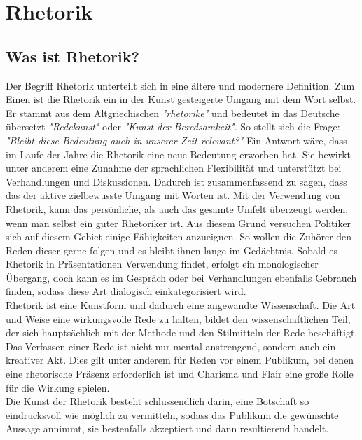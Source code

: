\section{Rhetorik} 
\label{sec:Rhetorik}

\subsection{Was ist Rhetorik?}
\label{sec: Was ist Rhetorik?}
Der Begriff Rhetorik unterteilt sich in eine ältere und modernere Definition.
Zum Einen ist die Rhetorik ein in der Kunst gesteigerte Umgang mit dem Wort selbst.
Er stammt aus dem Altgriechischen \textit{"rhetorike"} und bedeutet in das Deutsche 
übersetzt \textit{"Redekunst"} oder \textit{"Kunst der Beredsamkeit"}.
So stellt sich die Frage: \textit{"Bleibt diese Bedeutung auch in unserer Zeit relevant?"}
Ein Antwort wäre, dass im Laufe der Jahre die Rhetorik eine 
neue Bedeutung erworben hat. Sie bewirkt unter anderem eine Zunahme der sprachlichen 
Flexibilität und unterstützt bei Verhandlungen und Diskussionen. Dadurch ist 
zusammenfassend zu sagen, dass das der aktive zielbewusste Umgang mit Worten ist. Mit der 
Verwendung von Rhetorik, kann das persönliche, als auch das gesamte Umfelt überzeugt werden, 
wenn man selbst ein guter 
Rhetoriker ist. Aus diesem Grund versuchen Politiker sich auf diesem Gebiet einige 
Fähigkeiten anzueignen. So wollen die Zuhörer den Reden dieser gerne folgen und es 
bleibt ihnen lange im Gedächtnis. Sobald es Rhetorik in Präsentationen Verwendung findet, 
erfolgt ein monologischer Übergang, doch kann es im Gespräch oder bei Verhandlungen ebenfalls 
Gebrauch finden, sodass diese Art dialogisch einkategorisiert wird. 
\\Rhetorik ist eine Kunstform und dadurch eine angewandte Wissenschaft. Die Art und Weise eine wirkungsvolle 
Rede zu halten, bildet den wissenschaftlichen Teil, der sich hauptsächlich mit 
der Methode und den Stilmitteln der Rede beschäftigt. Das Verfassen einer Rede ist nicht nur 
mental anstrengend, sondern auch ein kreativer Akt. Dies gilt unter anderem für Reden 
vor einem Publikum, bei denen eine rhetorische Präsenz erforderlich ist und Charisma und Flair eine große Rolle 
für die Wirkung spielen. 
\\Die Kunst der Rhetorik besteht schlussendlich darin, eine Botschaft 
so eindrucksvoll wie möglich zu vermitteln, sodass das Publikum die gewünschte Aussage annimmt, 
sie bestenfalls akzeptiert und dann resultierend handelt.

